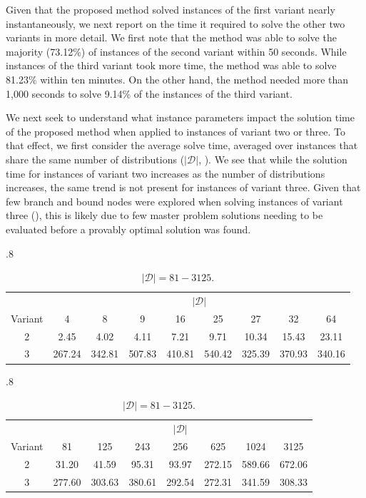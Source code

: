 \documentclass[12pt]{article}
\theoremstyle{thmstylethree}%
\newcommand{\mtc}[1] {\mathcal{#1}}
\begin{document}
Given that the proposed method solved instances of the first variant nearly instantaneously, we next report on the time it required to solve the other two variants in more detail. We first note that the method was able to solve the majority (73.12\%) of instances of the second variant within 50 seconds. While instances of the third variant took more time, the method was able to solve 81.23\% within ten minutes. On the other hand, the method needed more than 1,000 seconds to solve 9.14\% of the instances of the third variant.
 
We next seek to understand what instance parameters impact the solution time of the proposed method when applied to instances of variant two or three.  To that effect, we first consider the average solve time, averaged over instances that share the same number of distributions ($\vert \mtc{D} \vert$, ). 
We see that while the solution time for instances of variant two increases as the number of distributions increases, the same trend is not present for instances of variant three. Given that few branch and bound nodes were explored when solving instances of variant three  (), this is likely due to few master problem solutions needing to be evaluated before a provably optimal solution was found. 


\begin{table}[htp]
\centering
\small
\caption{Average time to solve by $\vert \mtc{D} \vert$.}
\label{tbl:solve_num_d_1}
\begin{subtable}{.8\linewidth}
\caption{$\vert \mtc{D} \vert = 4-64$.}
\begin{tabular}{|c|c|c|c|c|c|c|c|c|}
\hline
 & \multicolumn{8}{c|}{$\vert \mtc{D} \vert$} \\
Variant & 4 & 8 & 9 & 16 & 25 & 27 & 32 & 64 \\
\hline
2 & 2.45 & 4.02 & 4.11 & 7.21 & 9.71 & 10.34 & 15.43 & 23.11 \\
3 & 267.24 & 342.81 & 507.83 & 410.81 & 540.42 & 325.39 & 370.93 & 340.16 \\
\hline
\end{tabular}
\end{subtable}
\begin{subtable}{.8\linewidth}
\caption{$\vert \mtc{D} \vert = 81-3125$.}
\begin{tabular}{|c|c|c|c|c|c|c|c|}
\hline
 & \multicolumn{7}{c|}{$\vert \mtc{D} \vert$} \\
Variant &  81 & 125 & 243 & 256 & 625 & 1024 & 3125 \\
\hline
2 &  31.20 & 41.59 & 95.31 & 93.97 & 272.15 & 589.66 & 672.06 \\
3 &  277.60 & 303.63 & 380.61 & 292.54 & 272.31 & 341.59 & 308.33 \\
\hline
\end{tabular}
\end{subtable}
\end{table}
\end{document}

